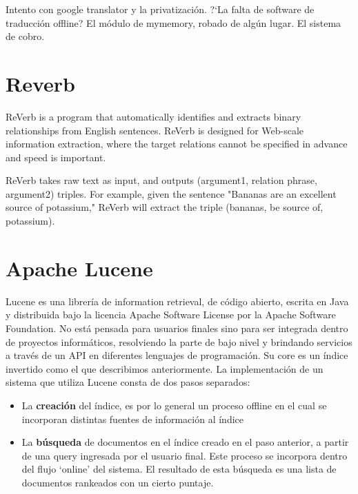 Intento con google translator y la privatización. ?`La falta de
software de traducción offline? El módulo de mymemory, robado de
algún lugar. El sistema de cobro. 

\section{Reverb}

ReVerb is a program that automatically identifies and extracts binary relationships from English sentences. ReVerb is designed for Web-scale information extraction, where the target relations cannot be specified in advance and speed is important.

ReVerb takes raw text as input, and outputs (argument1, relation phrase, argument2) triples. For example, given the sentence "Bananas are an excellent source of potassium," ReVerb will extract the triple (bananas, be source of, potassium).

\section{Apache Lucene}
\label{sec:lucene}
Lucene es una librería de information retrieval, de c\'odigo abierto, escrita en Java y distribuida 
bajo la licencia Apache Software License por la Apache Software Foundation. No está pensada para
usuarios finales sino para ser integrada dentro de proyectos informáticos, resolviendo
la parte de bajo nivel y brindando servicios a través de un API en diferentes lenguajes de programaci\'on.
Su core es un índice invertido como el que describimos anteriormente. La implementaci\'on de un sistema
que utiliza Lucene consta de dos pasos separados:
\begin{itemize}
\item La \textbf{creaci\'on} del índice, es por lo general un proceso offline en el cual 
se incorporan distintas fuentes de informaci\'on al índice 
\item La \textbf{búsqueda} de documentos en el índice creado en el paso anterior, a partir de una query 
ingresada por el usuario final. Este proceso se incorpora dentro del flujo `online' del sistema.
El resultado de esta búsqueda es una lista de documentos rankeados con un cierto puntaje. 
\end{itemize}

